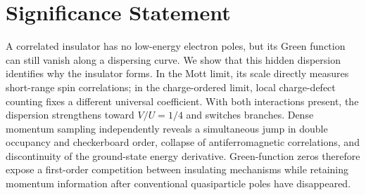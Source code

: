 \documentclass[11pt]{article}
\begin{document}
\section*{Significance Statement}
A correlated insulator has no low-energy electron poles, but its Green function can still vanish along a dispersing curve. We show that this hidden dispersion identifies why the insulator forms. In the Mott limit, its scale directly measures short-range spin correlations; in the charge-ordered limit, local charge-defect counting fixes a different universal coefficient. With both interactions present, the dispersion strengthens toward $V/U=1/4$ and switches branches. Dense momentum sampling independently reveals a simultaneous jump in double occupancy and checkerboard order, collapse of antiferromagnetic correlations, and discontinuity of the ground-state energy derivative. Green-function zeros therefore expose a first-order competition between insulating mechanisms while retaining momentum information after conventional quasiparticle poles have disappeared.
\end{document}
